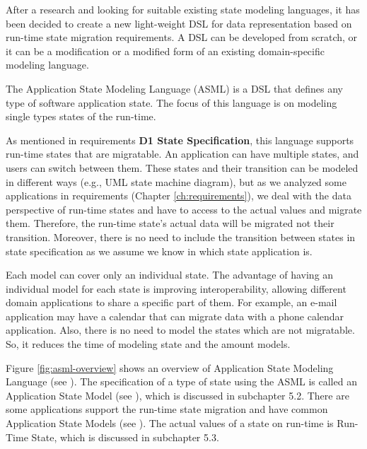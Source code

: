 After a research and looking for suitable existing state modeling languages, it has been decided to create a new light-weight DSL for data representation based on run-time state migration requirements.
A DSL can be developed from scratch, or it can be a modification or a modified form of an existing domain-specific modeling language.

The Application State Modeling Language (ASML) is a DSL that defines any type of software application state.
The focus of this language is on modeling single types states of the run-time.

As mentioned in requirements \textbf{D1 State Specification}, this language supports run-time states that are migratable.
An application can have multiple states, and users can switch between them.
These states and their transition can be modeled in different ways (e.g., UML state machine diagram), but as we analyzed some applications in requirements (Chapter \ref{ch:requirements}), we deal with the data perspective of run-time states and have to access to the actual values and migrate them. Therefore, the run-time state’s actual data will be migrated not their transition. Moreover, there is no need to include the transition between states in state specification as we assume we know in which state application is. 

Each model can cover only an individual state. The advantage of having an individual model for each state is improving interoperability, allowing different domain applications to share a specific part of them.
For example, an e-mail application may have a calendar that can migrate data with a phone calendar application.
Also, there is no need to model the states which are not migratable. So, it reduces the time of modeling state and the amount models. 

Figure \ref{fig:asml-overview} shows an overview of Application State Modeling Language (see \fcircone). The specification of a type of state using the ASML is called an Application State Model (see \fcirctwo), which is discussed in subchapter 5.2. There are some applications support the run-time state migration and have common Application State Models (see \fcircthree). The  actual values of a state on run-time is Run-Time State, which is discussed in subchapter 5.3.

